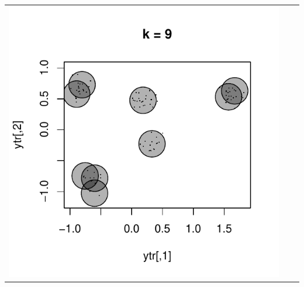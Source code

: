 \documentclass{beamer}
\begin{document}
\begin{frame}
\begin{center}
\begin{tabular}{ccc}
\includegraphics[scale = \scalesize, clip = true, trim = 0.3in 0.4in 0.3in 0.2in]{../conformal_kmeans/k9.pdf} \\
\end{tabular}
\end{center}
\end{frame}
\end{document}
